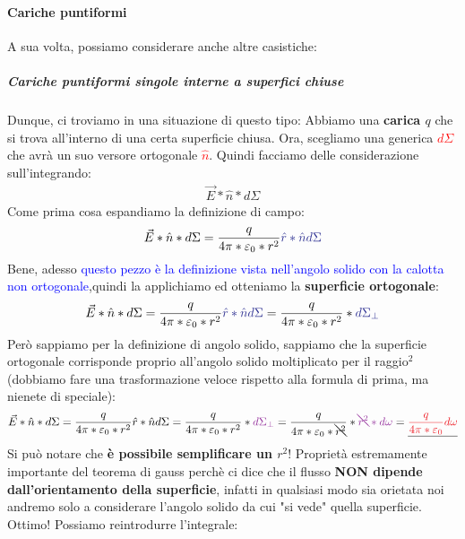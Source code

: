             \paragraph{Cariche puntiformi}
                A sua volta, possiamo considerare anche altre casistiche:
                \subparagraph{Cariche puntiformi singole interne a superfici chiuse}
                    Dunque, ci troviamo in una situazione di questo tipo:
                    Abbiamo una \textbf{carica $q$} che si trova all'interno di una certa superficie chiusa. Ora, scegliamo una generica \textcolor{Red}{$d\Sigma$} che avrà un suo versore ortogonale \textcolor{Red}{$\hat{n}$}. Quindi facciamo delle considerazione sull'integrando:
                    \begin{align*}
                        \vec{E}*\hat{n}*d\Sigma
                    \end{align*}
                    Come prima cosa espandiamo la definizione di campo:
                    \begin{align*}
                        \vec{E}*\hat{n}*d\Sigma=\frac{q}{4\pi*\varepsilon_0*r^2}\textcolor{Blue}{\hat{r}*\hat{n}d\Sigma}
                    \end{align*}
                    Bene, adesso \textcolor{Blue}{questo pezzo è la definizione vista nell'angolo solido con la calotta non ortogonale},quindi la applichiamo ed otteniamo la \textbf{superficie ortogonale}:
                    \begin{align*}
                        \vec{E}*\hat{n}*d\Sigma=\frac{q}{4\pi*\varepsilon_0*r^2}\textcolor{Blue}{\hat{r}*\hat{n}d\Sigma} = \frac{q}{4\pi*\varepsilon_0*r^2}*\textcolor{Blue}{d\Sigma_\perp}
                    \end{align*}
                    Però sappiamo per la definizione di angolo solido, sappiamo che la superficie ortogonale corrisponde proprio all'angolo solido moltiplicato per il raggio$^2$ (dobbiamo fare una trasformazione veloce rispetto alla formula di prima, ma nienete di speciale):
                    \begin{align*}
                        \vec{E}*\hat{n}*d\Sigma=\frac{q}{4\pi*\varepsilon_0*r^2}\hat{r}*\hat{n}d\Sigma = \frac{q}{4\pi*\varepsilon_0*r^2}*\textcolor{Purple}{d\Sigma_\perp} = \frac{q}{4\pi*\varepsilon_0*\bcancel{r^2}}*\textcolor{Purple}{\bcancel{r^2}*d\omega} = \underline{\textcolor{Red}{\frac{q}{4\pi*\varepsilon_0}d\omega}}
                    \end{align*}
                    Si può notare che \textbf{è possibile semplificare un $r^2$}! Proprietà estremamente importante del teorema di gauss perchè ci dice che il flusso \textbf{NON dipende dall'orientamento della superficie}, infatti in qualsiasi modo sia orietata noi andremo solo a considerare l'angolo solido da cui "si vede" quella superficie. Ottimo! Possiamo reintrodurre l'integrale:
